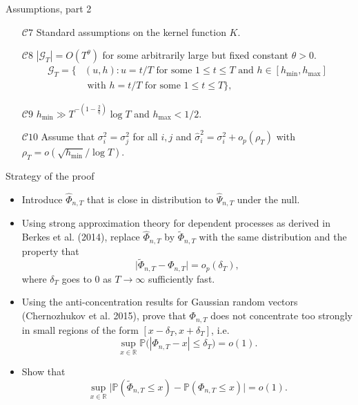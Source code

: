 \documentclass[10pt, handout]{beamer}
\newcommand{\Prob}{\mathbb{P}}
\begin{document}
\begin{frame}{Assumptions, part 2}
\begin{itemize}
\item[$\mathcal{C}7$]\label{C-ker} Standard assumptions on the kernel function $K$. \pause
\item[$\mathcal{C}8$] \label{C-grid} $|\mathcal{G}_T| = O(T^\theta)$ for some arbitrarily large but fixed constant $\theta > 0$.\pause
\begin{align*}
\mathcal{G}_T = \big\{ & (u,h): u = t/T \text{ for some } 1 \le t \le T \text{ and } h \in [h_{\min},h_{\max}] \\ & \text{ with } h = t/T \text{ for some } 1 \le t \le T  \big\},
\end{align*}\pause
\vspace{-5mm}
\item[$\mathcal{C}9$] \label{C-h} $h_{\min} \gg T^{-(1-\frac{2}{q})} \log T$ and $h_{\max} <1/2$.\pause
\item[$\mathcal{C}10$] Assume that $\sigma_i^2 = \sigma_j^2$ for all $i, j$ and $\widehat{\sigma}_i^2 = \sigma_i^2 + o_p(\rho_T)$ with $\rho_T = o(\sqrt{h_{\min}}/\log T)$.
\end{itemize}
\end{frame}

\begin{frame}{Strategy of the proof}
\begin{itemize}
\item Introduce $\widehat{\Phi}_{n, T}$ that is close in distribution to $\widehat{\Psi}_{n, T}$ under the null.\pause
\item Using strong approximation theory for dependent processes as derived in Berkes et al. (2014), replace $\widehat{\Phi}_{n, T}$ by $\widetilde{\Phi}_{n, T}$ with the same distribution and the property that 
\begin{equation*}\label{eq-theo-stat-strategy-step1}
\big| \widetilde{\Phi}_{n, T} - \Phi_{n, T} \big| = o_p(\delta_T),
\end{equation*}
where $\delta_T$ goes to $0$ as $T\to\infty$ sufficiently fast.\pause
\item Using the anti-concentration results for Gaussian random vectors (Chernozhukov et al. 2015), prove that $\Phi_{n, T}$ does not concentrate too strongly in small regions of the form $[x-\delta_T,x+\delta_T]$, i.e.
\begin{equation*}\label{eq-theo-stat-strategy-step2}
\sup_{x \in \mathbb{R}} \Prob \big( |\Phi_{n, T} - x| \le \delta_T \big) = o(1).
\end{equation*}\pause
\vspace{-2mm}
\item Show that 
\begin{equation*}\label{eq-theo-stat-strategy-claim}
\sup_{x \in \mathbb{R}} \big| \Prob(\widetilde{\Phi}_{n, T} \le x) - \Prob(\Phi_{n, T} \le x) \big| = o(1). 
\end{equation*}
\end{itemize}
\end{frame}
\end{document}
